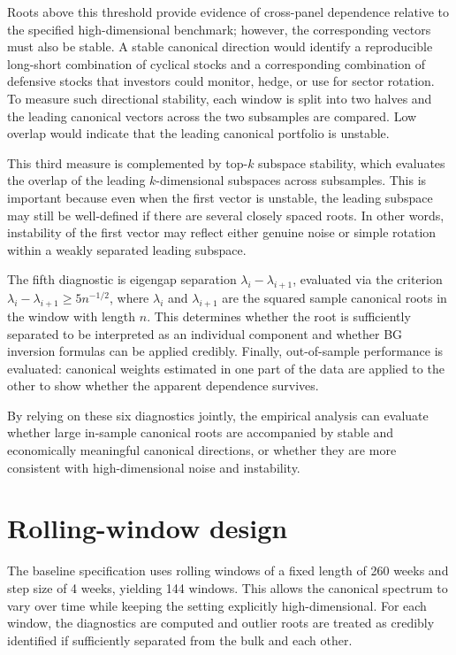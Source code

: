 \documentclass[12pt]{report} %
\begin{document}
Roots above this threshold provide evidence of cross-panel dependence relative to the specified 
high-dimensional benchmark; however, the corresponding vectors must also be stable. 
A stable canonical direction would identify a reproducible long-short combination of 
cyclical stocks and a corresponding combination of defensive stocks that investors 
could monitor, hedge, or use for sector rotation. 
To measure such directional stability, each window is split into two halves and the leading canonical 
vectors across the two subsamples are compared. Low overlap would 
indicate that the leading canonical portfolio is unstable.

This third measure is complemented by top-$k$ subspace stability, which evaluates the overlap of the 
leading $k$-dimensional subspaces across subsamples. This is important because even when the first vector is 
unstable, the leading subspace may still be well-defined if there are several closely spaced roots. In other words,
instability of the first vector may reflect either genuine noise or simple rotation within
a weakly separated leading subspace.

The fifth diagnostic is eigengap separation $\lambda_i-\lambda_{i+1}$, evaluated via the 
criterion $\lambda_{i}-\lambda_{i+1} \ge 5n^{-1/2}$, where $\lambda_{i}$ and $\lambda_{i+1}$
are the squared sample canonical roots in the window with length \(n\).
This determines whether the root is sufficiently separated to be interpreted as 
an individual component and whether BG inversion formulas can be applied credibly.  
Finally, out-of-sample performance is evaluated: canonical weights estimated in one part of 
the data are applied to the other 
to show whether the apparent dependence survives.

By relying on these six diagnostics jointly, the empirical analysis can evaluate whether large in-sample canonical 
roots are accompanied by stable and economically meaningful canonical directions, or whether they are more consistent 
with high-dimensional noise and instability.

\section{Rolling-window design}

The baseline specification uses rolling windows of a fixed length of 260 weeks and step size of 4 weeks, yielding
144 windows. This allows the canonical spectrum to vary over time while keeping the 
setting explicitly high-dimensional. For each window, the diagnostics are computed and outlier roots are treated as
credibly identified if sufficiently separated from the bulk and each other.
\end{document}
